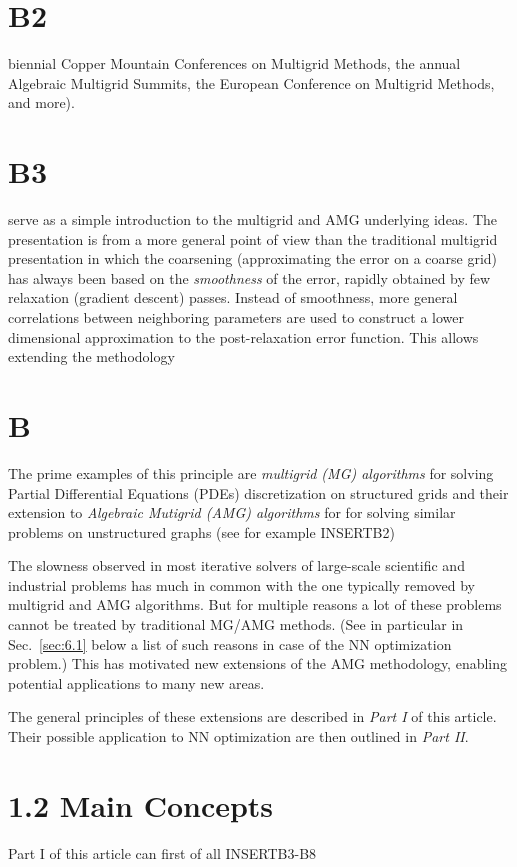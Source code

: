 \documentclass{article} %
\newcommand{\ins}{INSERT}
\begin{document}
\section{B2}
biennial Copper Mountain Conferences on Multigrid Methods, the annual Algebraic Multigrid Summits, the European Conference on Multigrid Methods, and more).

\section{B3}
serve as a simple introduction to the multigrid and AMG underlying ideas. The presentation is from a more general point of view than the traditional multigrid presentation in which the coarsening (approximating the error on a coarse grid) has always been based on the {\it smoothness} of the error, rapidly obtained by few relaxation (gradient descent) passes. Instead of smoothness, more general correlations between neighboring parameters are used to construct a lower dimensional approximation to the post-relaxation error function. This allows extending the methodology

\section{B}
The prime examples of this principle are {\it multigrid (MG) algorithms} for solving Partial Differential Equations (PDEs) discretization on structured grids \cite{?} and their extension to {\it Algebraic Mutigrid (AMG) algorithms} for for solving similar problems on unstructured graphs (see for example \ins{B2})

The slowness observed in most iterative solvers of large-scale scientific and industrial problems has much in common with the one typically removed by multigrid and AMG algorithms. But for multiple reasons a lot of these problems cannot be treated by traditional MG/AMG methods. (See in particular in Sec.~\ref{sec:6.1} below a list of such reasons in case of the NN optimization problem.) This has motivated new extensions of the AMG methodology, enabling potential applications to many new areas.

The general principles of these extensions are described in {\it Part I} of this article. Their possible application to NN optimization are then outlined in {\it Part II}.

\section{1.2 Main Concepts}
Part I of this article can first of all \ins{B3-B8}
\end{document}
